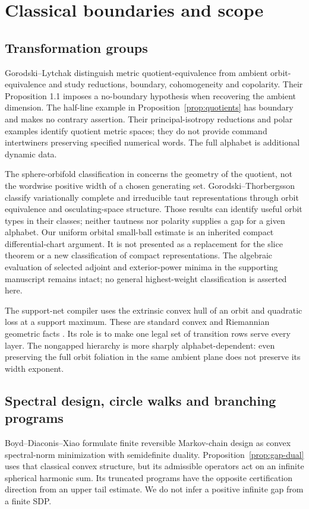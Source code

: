 \section{Classical boundaries and scope}\label{sec:comparison}
\subsection{Transformation groups}
Gorodski--Lytchak \cite[Section 1 and Proposition 1.1]{GLorbit} distinguish metric quotient-equivalence from ambient orbit-equivalence and study reductions, boundary, cohomogeneity and copolarity. Their Proposition 1.1 imposes a no-boundary hypothesis when recovering the ambient dimension. The half-line example in Proposition~\ref{prop:quotients} has boundary and makes no contrary assertion. Their principal-isotropy reductions and polar examples identify quotient metric spaces; they do not provide command intertwiners preserving specified numerical words. The full alphabet is additional dynamic data.

The sphere-orbifold classification in \cite[Theorem 1.1]{GLorbifold} concerns the geometry of the quotient, not the wordwise positive width of a chosen generating set. Gorodski--Thorbergsson \cite[Theorems 1.1 and 1.2]{GTorbit} classify variationally complete and irreducible taut representations through orbit equivalence and osculating-space structure. Those results can identify useful orbit types in their classes; neither tautness nor polarity supplies a gap for a given alphabet. Our uniform orbital small-ball estimate is an inherited compact differential-chart argument. It is not presented as a replacement for the slice theorem or a new classification of compact representations. The algebraic evaluation of selected adjoint and exterior-power minima in the supporting manuscript remains intact; no general highest-weight classification is asserted here.

The support-net compiler uses the extrinsic convex hull of an orbit and quadratic loss at a support maximum. These are standard convex and Riemannian geometric facts \cite{Barvinok,Orbitopes,Iacobelli}. Its role is to make one legal set of transition rows serve every layer. The nongapped hierarchy is more sharply alphabet-dependent: even preserving the full orbit foliation in the same ambient plane does not preserve its width exponent.

\subsection{Spectral design, circle walks and branching programs}
Boyd--Diaconis--Xiao \cite[Sections 2--4]{BDX} formulate finite reversible Markov-chain design as convex spectral-norm minimization with semidefinite duality. Proposition~\ref{prop:gap-dual} uses that classical convex structure, but its admissible operators act on an infinite spherical harmonic sum. Its truncated programs have the opposite certification direction from an upper tail estimate. We do not infer a positive infinite gap from a finite SDP.

